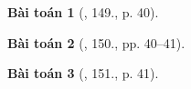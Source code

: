 \documentclass{article}
\newtheorem{baitoan}{Bài toán}
\begin{document}
\begin{baitoan}[\cite{An_400_BT_Hoa_Hoc_9}, 149., p. 40]
	
\end{baitoan}

\begin{baitoan}[\cite{An_400_BT_Hoa_Hoc_9}, 150., pp. 40--41]
	
\end{baitoan}

\begin{baitoan}[\cite{An_400_BT_Hoa_Hoc_9}, 151., p. 41]
	
\end{baitoan}


\printbibliography[heading=bibintoc]
\end{document}
